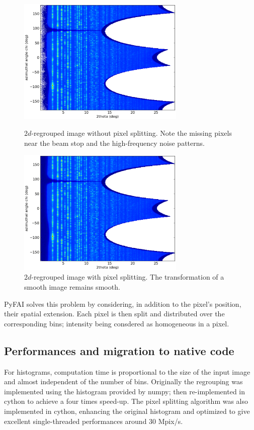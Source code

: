 \documentclass[a4paper]{jpconf}
\begin{document}
\begin{figure}[h]
\begin{minipage}{8cm}
\includegraphics[width=8cm]{img/2Dhistogram.eps}
\caption{\label{rough}$2d$-regrouped image without pixel splitting. Note the
missing pixels near the beam stop and the high-frequency noise patterns.}
\end{minipage}\hspace{5mm}
\begin{minipage}{8cm}
\includegraphics[width=8cm]{img/2DwithSplit.eps}
\caption{\label{smooth}$2d$-regrouped image with pixel splitting. The
transformation of a smooth image remains smooth.}
\end{minipage}
\end{figure}

PyFAI solves this problem by considering, in addition to the pixel's position,
their spatial extension. Each pixel is then split and distributed over the
corresponding bins; intensity being consdered as homogeneous in a pixel.

\subsection{Performances and migration to native code}
For histograms, computation time is proportional to the size of the input image
and almost independent of the number of bins. Originally the regrouping was implemented
using the histogram provided by numpy\cite{numpy}; then re-implemented in
cython\cite{cython} to achieve a four times speed-up.
The pixel splitting algorithm was also implemented in cython, enhancing the
original histogram and optimized to give excellent single-threaded performances
around 30 Mpix/s.
\end{document}
